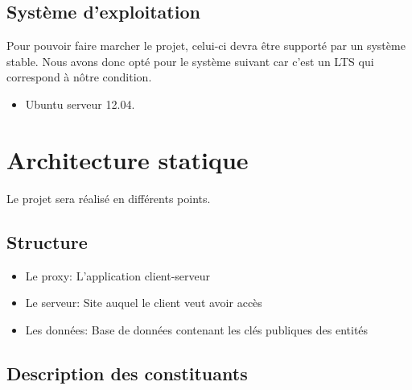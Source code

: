 \documentclass[a4paper,11pt,french]{article}
\begin{document}
\subsection{Système d'exploitation}
Pour pouvoir faire marcher le projet, celui-ci devra être supporté par un système stable. Nous avons donc opté pour le système suivant car c'est un LTS qui correspond à nôtre condition.
\begin{itemize}
\item Ubuntu serveur 12.04. 
\end{itemize}






\section{Architecture statique}
Le projet sera réalisé en différents points. 
\subsection{Structure}
\begin{itemize}
\item Le proxy: L'application client-serveur
\item Le serveur: Site auquel le client veut avoir accès
\item Les données: Base de données contenant les clés publiques des entités
\end{itemize}




\subsection{Description des constituants}
\end{document}
